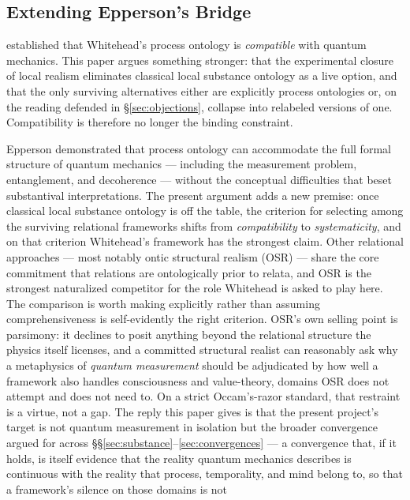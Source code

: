 \subsection{Extending Epperson's Bridge}

\citet{Epperson2004} established that Whitehead's process ontology is
\emph{compatible} with quantum mechanics.
This paper argues something stronger: that the experimental closure of
local realism eliminates classical local substance ontology as a live
option, and that the only surviving alternatives either are explicitly
process ontologies or, on the reading defended in \S\ref{sec:objections},
collapse into relabeled versions of one.
Compatibility is therefore no longer the binding constraint.

Epperson demonstrated that process ontology can accommodate the full
formal structure of quantum mechanics --- including the measurement problem,
entanglement, and decoherence --- without the conceptual difficulties that
beset substantival interpretations.
The present argument adds a new premise: once classical local substance
ontology is off the table, the criterion for selecting among the surviving
relational frameworks shifts from \emph{compatibility} to
\emph{systematicity}, and on that criterion Whitehead's framework has the
strongest claim.
Other relational approaches --- most notably ontic structural realism
(OSR) \citep{LadymanRoss2007} --- share the core commitment that relations
are ontologically prior to relata, and OSR is the strongest naturalized
competitor for the role Whitehead is asked to play here.
The comparison is worth making explicitly rather than assuming
comprehensiveness is self-evidently the right criterion.
OSR's own selling point is parsimony: it declines to posit anything
beyond the relational structure the physics itself licenses, and a
committed structural realist can reasonably ask why a metaphysics of
\emph{quantum measurement} should be adjudicated by how well a framework
also handles consciousness and value-theory, domains OSR does not
attempt and does not need to.
On a strict Occam's-razor standard, that restraint is a virtue, not a
gap.
The reply this paper gives is that the present project's target is not
quantum measurement in isolation but the broader convergence argued for
across \S\S\ref{sec:substance}--\ref{sec:convergences} --- a convergence
that, if it holds, is itself evidence that the reality quantum mechanics
describes is continuous with the reality that process, temporality, and
mind belong to, so that a framework's silence on those domains is not
